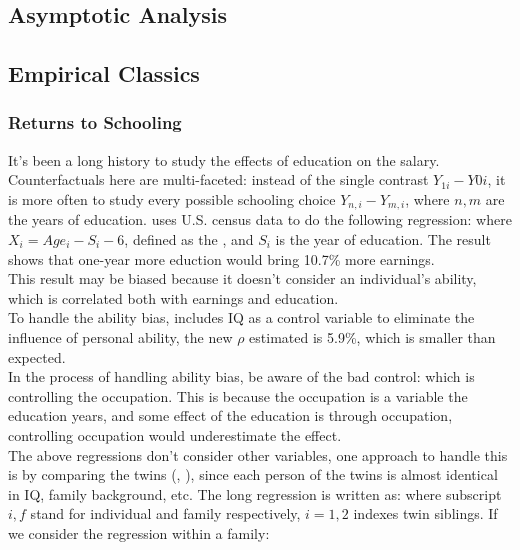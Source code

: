 \documentclass[12pt]{report}
\begin{document}
\subsection{Asymptotic Analysis}

\subsection{Empirical Classics}

\subsubsection{Returns to Schooling}
It's been a long history to study the effects of education on the salary. Counterfactuals here are multi-faceted: instead of the
single contrast $Y_{1i}-Y{0i}$, it is more often to study every possible schooling choice $Y_{n,i}-Y_{m,i}$, where $n,m$ are the
years of education.
\cite{mincer1974schooling} uses U.S. census data to do the following regression:
where $X_i=Age_i-S_i-6$, defined as the , and $S_i$ is the year of education. The result shows that one-year more eduction would bring 10.7\% more earnings.\\
This result may be biased because it doesn't consider an individual's ability, which is correlated both with earnings and education.\\
To handle the ability bias, \cite{griliches1977estimating} includes IQ as a control variable to eliminate the influence of personal
ability, the new $\rho$ estimated is 5.9\%, which is smaller than expected.\\
In the process of handling ability bias, be aware of the bad control: which is controlling the occupation. This is because the occupation
is a variable  the education years, and some effect of the education is through occupation, controlling occupation would
underestimate the effect. \\
The above regressions don't consider other variables, one approach to handle this is by comparing the twins
(\cite{ashenfelter1994estimates}, \cite{ashenfelter1998income}), since each person of the twins is almost identical in IQ,
family background, etc. The long regression is written as:
where subscript $i,f$ stand for individual and family respectively, $i=1,2$ indexes twin siblings. If we consider the regression within a family:
\end{document}
